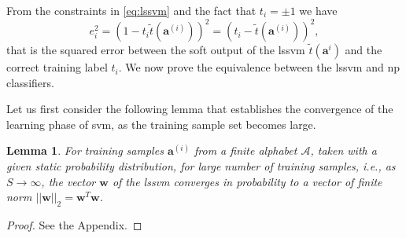 \documentclass[draftcls,onecolumn,12pt]{IEEEtran}
\newtheorem{lemma}{Lemma}
\begin{document}
From the constraints in \eqref{eq:lssvm} and the fact that $t_i = \pm 1$ we have
\begin{equation}
\label{eq:els}
e_i^2 = (1 - t_i\tilde{t}(\bm{a}^{(i)}) )^2 = (t_i - \tilde{t}(\bm{a}^{(i)}))^2,
\end{equation}
that is the squared error between the soft output of the \ac{lssvm} $\tilde{t}(\bm{a}^i)$ and the correct training label $t_i$. We now prove the equivalence between the \ac{lssvm} and \ac{np} classifiers. 

Let us first consider the following lemma that establishes the convergence of the learning phase of \ac{svm}, as the training sample set becomes large.

\begin{lemma}
	\label{lem:lem1}
	For training samples $\bm{a}^{(i)}$ from a finite alphabet $\mathcal A$, taken with a given static probability distribution, for large number of training samples, i.e., as $S \rightarrow \infty$, the vector $\bm{w}$ of the \ac{lssvm} converges in probability to a vector of finite norm $||\bm{w}||_2 = \bm{w}^T\bm{w}$.
\end{lemma}

\begin{proof}
See the Appendix.
\end{proof}
 
\end{document}
